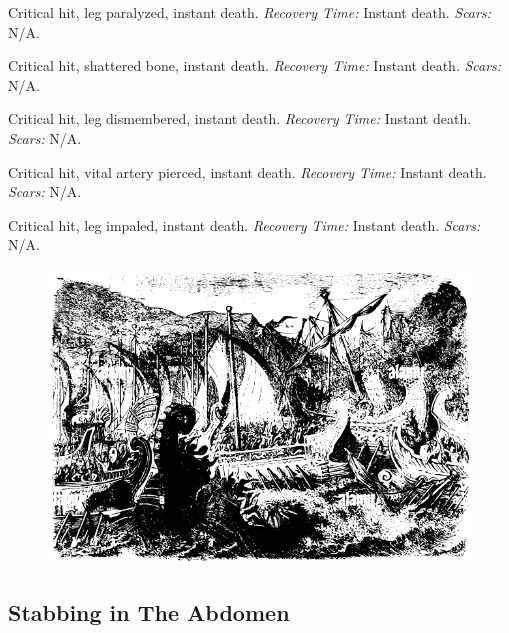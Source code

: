 \documentclass[12pt]{book}  %
\begin{document}
\begin{description}[labelwidth=1.5em, leftmargin=*, itemsep=0.4em]
    \item[16 -] Critical hit, leg paralyzed, instant death. \textit{Recovery Time:} Instant death. \textit{Scars:} N/A.
    \item[17 -] Critical hit, shattered bone, instant death. \textit{Recovery Time:} Instant death. \textit{Scars:} N/A.
    \item[18 -] Critical hit, leg dismembered, instant death. \textit{Recovery Time:} Instant death. \textit{Scars:} N/A.
    \item[19 -] Critical hit, vital artery pierced, instant death. \textit{Recovery Time:} Instant death. \textit{Scars:} N/A.
    \item[20 -] Critical hit, leg impaled, instant death. \textit{Recovery Time:} Instant death. \textit{Scars:} N/A.
\end{description}

\begin{figure}[h]
    \centering
    \includegraphics[width=\textwidth]{./images/combat11.pdf}
\end{figure}

\subsection{Stabbing in The Abdomen}
\end{document}
